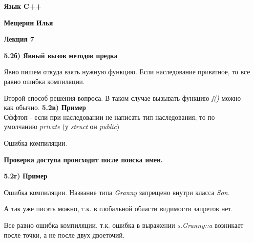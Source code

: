 \documentclass{article}
\begin{document}
\begin{center}
	\begin{LARGE}
		\textbf{Язык C++}
	\end{LARGE}
\end{center}
\begin{center}
	\begin{normalsize}
		\textbf{Мещерин Илья}
	\end{normalsize}
\end{center}
\begin{center}
	\begin{Large}
		\textbf{Лекция 7}
	\end{Large}
\end{center}

\noindent \textbf{5.2б) Явный вызов методов предка}

Явно пишем откуда взять нужную функцию. Если наследование приватное, то все равно ошибка компиляции.

Второй способ решения вопроса. В таком случае вызывать функцию \textit{f()} можно как обычно.
\noindent \textbf{5.2в) Пример}\\
Оффтоп - если при наследовании не написать тип наследования, то по умолчанию \textit{private} (у \textit{struct} он \textit{public})

Ошибка компиляции.\begin{large}
	\textbf{Проверка доступа происходит после поиска имен.}
\end{large}
\noindent \textbf{5.2г) Пример}

Ошибка компиляции. Название типа \textit{Granny} запрещено внутри класса \textit{Son}.

А так уже писать можно, т.к. в глобальной области видимости запретов нет.

Все равно ошибка компиляции, т.к. ошибка в выражении \textit{s.Granny::a} возникает после точки, а не после двух двоеточий.

\end{document}
